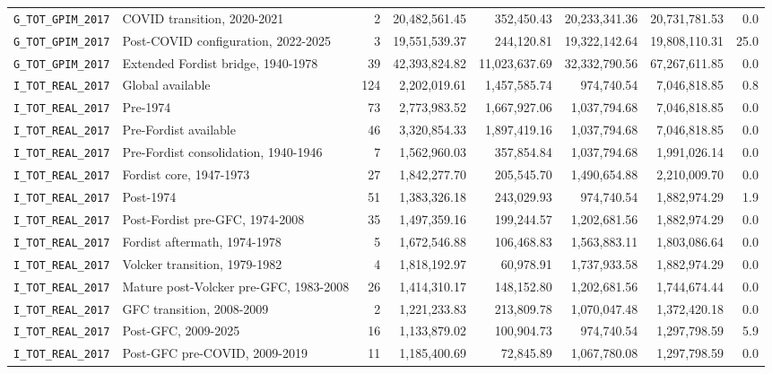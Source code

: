 \begin{landscape}
\begin{longtable}{p{4.4cm}p{3.8cm}rrrrrr}
\\
\nolinkurl{G_TOT_GPIM_2017} & COVID transition, 2020-2021 & 2 & 20,482,561.45 & 352,450.43 & 20,233,341.36 & 20,731,781.53 & 0.0
\\
\nolinkurl{G_TOT_GPIM_2017} & Post-COVID configuration, 2022-2025 & 3 & 19,551,539.37 & 244,120.81 & 19,322,142.64 & 19,808,110.31 & 25.0
\\
\nolinkurl{G_TOT_GPIM_2017} & Extended Fordist bridge, 1940-1978 & 39 & 42,393,824.82 & 11,023,637.69 & 32,332,790.56 & 67,267,611.85 & 0.0
\\
\nolinkurl{I_TOT_REAL_2017} & Global available & 124 & 2,202,019.61 & 1,457,585.74 & 974,740.54 & 7,046,818.85 & 0.8
\\
\nolinkurl{I_TOT_REAL_2017} & Pre-1974 & 73 & 2,773,983.52 & 1,667,927.06 & 1,037,794.68 & 7,046,818.85 & 0.0
\\
\nolinkurl{I_TOT_REAL_2017} & Pre-Fordist available & 46 & 3,320,854.33 & 1,897,419.16 & 1,037,794.68 & 7,046,818.85 & 0.0
\\
\nolinkurl{I_TOT_REAL_2017} & Pre-Fordist consolidation, 1940-1946 & 7 & 1,562,960.03 & 357,854.84 & 1,037,794.68 & 1,991,026.14 & 0.0
\\
\nolinkurl{I_TOT_REAL_2017} & Fordist core, 1947-1973 & 27 & 1,842,277.70 & 205,545.70 & 1,490,654.88 & 2,210,009.70 & 0.0
\\
\nolinkurl{I_TOT_REAL_2017} & Post-1974 & 51 & 1,383,326.18 & 243,029.93 & 974,740.54 & 1,882,974.29 & 1.9
\\
\nolinkurl{I_TOT_REAL_2017} & Post-Fordist pre-GFC, 1974-2008 & 35 & 1,497,359.16 & 199,244.57 & 1,202,681.56 & 1,882,974.29 & 0.0
\\
\nolinkurl{I_TOT_REAL_2017} & Fordist aftermath, 1974-1978 & 5 & 1,672,546.88 & 106,468.83 & 1,563,883.11 & 1,803,086.64 & 0.0
\\
\nolinkurl{I_TOT_REAL_2017} & Volcker transition, 1979-1982 & 4 & 1,818,192.97 & 60,978.91 & 1,737,933.58 & 1,882,974.29 & 0.0
\\
\nolinkurl{I_TOT_REAL_2017} & Mature post-Volcker pre-GFC, 1983-2008 & 26 & 1,414,310.17 & 148,152.80 & 1,202,681.56 & 1,744,674.44 & 0.0
\\
\nolinkurl{I_TOT_REAL_2017} & GFC transition, 2008-2009 & 2 & 1,221,233.83 & 213,809.78 & 1,070,047.48 & 1,372,420.18 & 0.0
\\
\nolinkurl{I_TOT_REAL_2017} & Post-GFC, 2009-2025 & 16 & 1,133,879.02 & 100,904.73 & 974,740.54 & 1,297,798.59 & 5.9
\\
\nolinkurl{I_TOT_REAL_2017} & Post-GFC pre-COVID, 2009-2019 & 11 & 1,185,400.69 & 72,845.89 & 1,067,780.08 & 1,297,798.59 & 0.0

\end{longtable}
\end{landscape}
